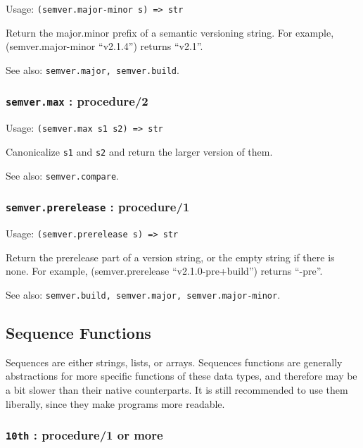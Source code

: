\documentclass[
]{article}
\newcommand{\passthrough}[1]{#1}
\begin{document}
Usage: \passthrough{\lstinline!(semver.major-minor s) => str!}

Return the major.minor prefix of a semantic versioning string. For
example, (semver.major-minor ``v2.1.4'') returns ``v2.1''.

See also: \passthrough{\lstinline!semver.major, semver.build!}.

\hypertarget{semver.max-procedure2}{%
\subsubsection{\texorpdfstring{\texttt{semver.max} :
procedure/2}{semver.max : procedure/2}}\label{semver.max-procedure2}}

Usage: \passthrough{\lstinline!(semver.max s1 s2) => str!}

Canonicalize \passthrough{\lstinline!s1!} and
\passthrough{\lstinline!s2!} and return the larger version of them.

See also: \passthrough{\lstinline!semver.compare!}.

\hypertarget{semver.prerelease-procedure1}{%
\subsubsection{\texorpdfstring{\texttt{semver.prerelease} :
procedure/1}{semver.prerelease : procedure/1}}\label{semver.prerelease-procedure1}}

Usage: \passthrough{\lstinline!(semver.prerelease s) => str!}

Return the prerelease part of a version string, or the empty string if
there is none. For example, (semver.prerelease ``v2.1.0-pre+build'')
returns ``-pre''.

See also:
\passthrough{\lstinline!semver.build, semver.major, semver.major-minor!}.

\hypertarget{sequence-functions}{%
\subsection{Sequence Functions}\label{sequence-functions}}

Sequences are either strings, lists, or arrays. Sequences functions are
generally abstractions for more specific functions of these data types,
and therefore may be a bit slower than their native counterparts. It is
still recommended to use them liberally, since they make programs more
readable.

\hypertarget{th-procedure1-or-more}{%
\subsubsection{\texorpdfstring{\texttt{10th} : procedure/1 or
more}{10th : procedure/1 or more}}\label{th-procedure1-or-more}}
\end{document}
